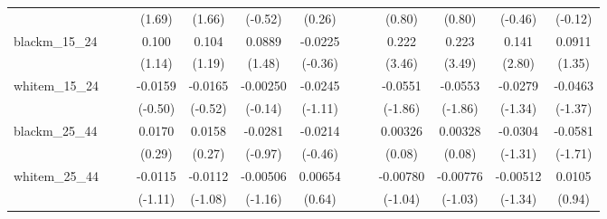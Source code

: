 {\begin{tabular}{l*{12}{c}}
            &                     &                     &      (1.69)         &      (1.66)         &     (-0.52)         &      (0.26)         &                     &                     &      (0.80)         &      (0.80)         &     (-0.46)         &     (-0.12)         \\
[1em]
blackm\_15\_24&                     &                     &       0.100         &       0.104         &      0.0889         &     -0.0225         &                     &                     &       0.222\sym{**} &       0.223\sym{**} &       0.141\sym{**} &      0.0911         \\
            &                     &                     &      (1.14)         &      (1.19)         &      (1.48)         &     (-0.36)         &                     &                     &      (3.46)         &      (3.49)         &      (2.80)         &      (1.35)         \\
[1em]
whitem\_15\_24&                     &                     &     -0.0159         &     -0.0165         &    -0.00250         &     -0.0245         &                     &                     &     -0.0551         &     -0.0553         &     -0.0279         &     -0.0463         \\
            &                     &                     &     (-0.50)         &     (-0.52)         &     (-0.14)         &     (-1.11)         &                     &                     &     (-1.86)         &     (-1.86)         &     (-1.34)         &     (-1.37)         \\
[1em]
blackm\_25\_44&                     &                     &      0.0170         &      0.0158         &     -0.0281         &     -0.0214         &                     &                     &     0.00326         &     0.00328         &     -0.0304         &     -0.0581         \\
            &                     &                     &      (0.29)         &      (0.27)         &     (-0.97)         &     (-0.46)         &                     &                     &      (0.08)         &      (0.08)         &     (-1.31)         &     (-1.71)         \\
[1em]
whitem\_25\_44&                     &                     &     -0.0115         &     -0.0112         &    -0.00506         &     0.00654         &                     &                     &    -0.00780         &    -0.00776         &    -0.00512         &      0.0105         \\
            &                     &                     &     (-1.11)         &     (-1.08)         &     (-1.16)         &      (0.64)         &                     &                     &     (-1.04)         &     (-1.03)         &     (-1.34)         &      (0.94)         \\

\end{tabular}}
